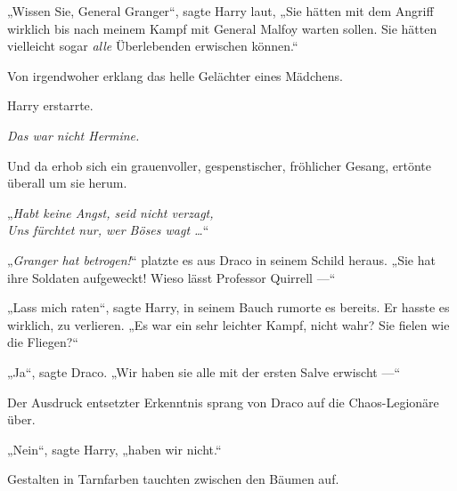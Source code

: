 „Wissen Sie, General Granger“, sagte Harry laut,
„Sie hätten mit dem Angriff wirklich bis nach meinem Kampf mit General Malfoy warten sollen. Sie hätten vielleicht sogar \emph{alle} Überlebenden erwischen können.“

Von irgendwoher erklang das helle Gelächter eines Mädchens.

Harry erstarrte.

\emph{Das war nicht Hermine.}

Und da erhob sich ein grauenvoller, gespenstischer, fröhlicher Gesang, ertönte überall um sie herum.

„\emph{Habt keine Angst, seid nicht verzagt,\\
Uns fürchtet nur, wer Böses wagt …}“

„\emph{Granger hat betrogen!}“ platzte es aus Draco in seinem Schild heraus.
„Sie hat ihre Soldaten aufgeweckt! Wieso lässt Professor Quirrell —“

„Lass mich raten“, sagte Harry, in seinem Bauch rumorte es bereits. Er hasste es wirklich, zu verlieren.
„Es war ein sehr leichter Kampf, nicht wahr? Sie fielen wie die Fliegen?“

„Ja“, sagte Draco.
„Wir haben sie alle mit der ersten Salve erwischt —“

Der Ausdruck entsetzter Erkenntnis sprang von Draco auf die Chaos-Legionäre über.

„Nein“, sagte Harry, „haben wir nicht.“

Gestalten in Tarnfarben tauchten zwischen den Bäumen auf.

